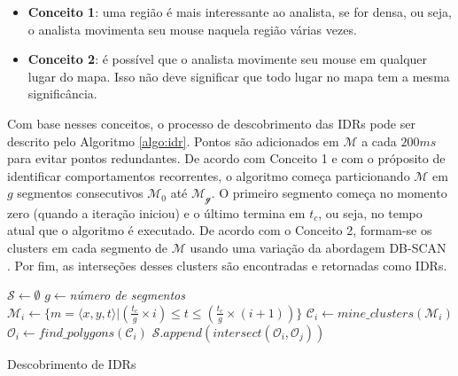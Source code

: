 \begin{itemize}
	\item \textbf{Conceito 1}: uma região é mais interessante ao analista, se for densa, ou seja, o analista movimenta seu mouse naquela região várias vezes.
	\item \textbf{Conceito 2}: é possível que o analista movimente seu mouse em qualquer lugar do mapa. Isso não deve significar que todo lugar no mapa tem a mesma significância.
\end{itemize}

Com base nesses conceitos, o processo de descobrimento das IDRs pode ser descrito pelo Algoritmo \ref{algo:idr}. Pontos são adicionados em $\mathcal{M}$ a cada $200ms$ para evitar pontos redundantes. De acordo com Conceito 1 e com o próposito de identificar comportamentos recorrentes, o algoritmo começa particionando $\mathcal{M}$ em $g$ segmentos consecutivos $\mathcal{M_0}$ até $\mathcal{M_g}$. O primeiro segmento começa no momento zero (quando a iteração iniciou) e o último termina em $t_c$, ou seja, no tempo atual que o algoritmo é executado. De acordo com o Conceito 2, formam-se os clusters em cada segmento de $\mathcal{M}$ usando uma variação da abordagem DB-SCAN \cite{Ester:1996}. Por fim, as interseções desses clusters são encontradas e retornadas como IDRs.

\begin{algorithm}[t]
	\DontPrintSemicolon
	$\mathcal{S} \gets \emptyset$\;
	$g \gets ${\em número de segmentos}\;
	{
		   $\mathcal{M}_i \gets \{m = \langle x,y,t \rangle | (\frac{t_c}{g} \times i) \leq t \leq (\frac{t_c}{g} \times (i+1))\}$\;
		   $\mathcal{C}_i \gets \mathit{mine\_clusters}(\mathcal{M}_i)$\label{ln:mine}\;
		   $\mathcal{O}_i \gets \mathit{find\_polygons}(\mathcal{C}_i)$\label{ln:poly}\;
	}
	{
		   $\mathcal{S}.\mathit{append}(\mathit{intersect}(\mathcal{O}_i, \mathcal{O}_j))$
	}
	\; 
	\caption{Descobrimento de IDRs}
	\label{algo:idr}
\end{algorithm}

